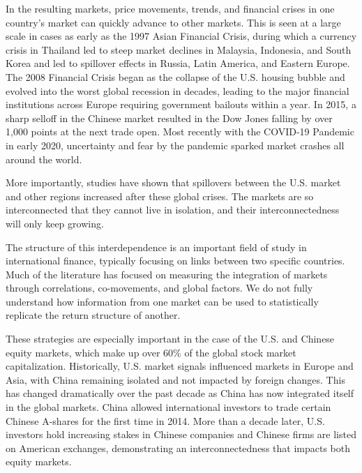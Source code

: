 In the resulting markets, price movements, trends, and financial crises in one country's market can quickly advance to other markets. This is seen at a large scale in cases as early as the 1997 Asian Financial Crisis, during which a currency crisis in Thailand led to steep market declines in Malaysia, Indonesia, and South Korea and led to spillover effects in Russia, Latin America, and Eastern Europe.\cite{scenarios} The 2008 Financial Crisis began as the collapse of the U.S. housing bubble and evolved into the worst global recession in decades, leading to the major financial institutions across Europe requiring government bailouts within a year.\cite{scenarios} In 2015, a sharp selloff in the Chinese market resulted in the Dow Jones falling by over 1,000 points at the next trade open.\cite{scenarios} Most recently with the COVID-19 Pandemic in early 2020, uncertainty and fear by the pandemic sparked market crashes all around the world.\cite{scenarios}

More importantly, studies have shown that spillovers between the U.S. market and other regions increased after these global crises. The markets are so interconnected that they cannot live in isolation, and their interconnectedness will only keep growing.

The structure of this interdependence is an important field of study in international finance, typically focusing on links between two specific countries. Much of the literature has focused on measuring the integration of markets through correlations, co-movements, and global factors. We do not fully understand how information from one market can be used to statistically replicate the return structure of another. 

These strategies are especially important in the case of the U.S. and Chinese equity markets, which make up over 60\% of the global stock market capitalization. Historically, U.S. market signals influenced markets in Europe and Asia, with China remaining isolated and not impacted by foreign changes. This has changed dramatically over the past decade as China has now integrated itself in the global markets. China allowed international investors to trade certain Chinese A-shares for the first time in 2014.\cite{IMF} More than a decade later, U.S. investors hold increasing stakes in Chinese companies and Chinese firms are listed on American exchanges, demonstrating an interconnectedness that impacts both equity markets.

